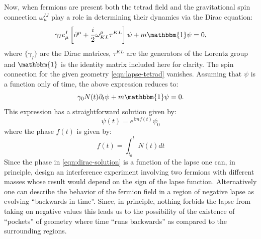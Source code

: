 \documentclass[preprint]{SciPost}
\newcommand{\id}{\mathbbm{1}}
\theoremstyle{plain} %
\begin{document}
Now, when fermions are present both the tetrad field and the gravitational spin connection $ \omega_\mu^{IJ} $ play  a role in determining their dynamics via the Dirac equation:
\begin{equation}\label{eqn:massive-dirac-eqn}
\gamma_I e_\mu^I \left[ \partial^\mu + \frac{i}{2} \omega^\mu_{KL} \tau^{KL} \right] \psi + m \id \psi = 0,
\end{equation}
where $ \{\gamma_I\} $ are the Dirac matrices, $ \tau^{KL} $ are the generators of the Lorentz group and $ \id $ is the identity matrix included here for clarity. The spin connection for the given geometry \eqref{eqn:lapse-tetrad} vanishes. Assuming that $ \psi $ is a function only of time, the above expression reduces to:
\begin{equation}\label{eqn:reduced-dirac-eqn}
\gamma_0 N(t) \partial_t \psi + m \id \psi = 0.
\end{equation}
This expression has a straightforward solution given by:
\begin{equation}\label{eqn:dirac-solution}
\psi(t) = e^{i m f(t) } \psi_0
\end{equation}
where the phase $ f(t) $ is given by:
\begin{equation}\label{eqn:dirac-phase}
f(t) = \int_{t_0}^{t} N(t) dt
\end{equation}
Since the phase in \eqref{eqn:dirac-solution} is a function of the lapse one can, in principle, design an interference experiment involving two fermions with different masses whose result would depend on the sign of the lapse function. Alternatively one can describe the behavior of the fermion field in a region of negative lapse as evolving ``backwards in time''. Since, in principle, nothing forbids the lapse from taking on negative values this leads us to the possibility of the existence of ``pockets'' of geometry where time ``runs backwards'' as compared to the surrounding regions.
\end{document}
